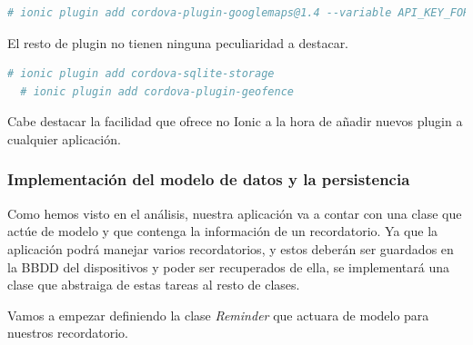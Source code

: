 \begin{lstlisting}[language=bash]
  # ionic plugin add cordova-plugin-googlemaps@1.4 --variable API_KEY_FOR_ANDROID=MY_API_KEY
\end{lstlisting}

El resto de plugin no tienen ninguna peculiaridad a destacar.

\begin{lstlisting}[language=bash]
  # ionic plugin add cordova-sqlite-storage
  # ionic plugin add cordova-plugin-geofence
\end{lstlisting}

Cabe destacar la facilidad que ofrece no Ionic a la hora de añadir nuevos plugin a cualquier aplicación.

\subsubsection{Implementación del modelo de datos y la persistencia}

Como hemos visto en el análisis, nuestra aplicación va a contar con una clase que actúe de modelo y que contenga la información de un recordatorio. Ya que la aplicación podrá manejar varios recordatorios, y estos deberán ser guardados en la \gls{BBDD} del dispositivos y poder ser recuperados de ella, se implementará una clase que abstraiga de estas tareas al resto de clases.


Vamos a empezar definiendo la clase \emph{Reminder} que actuara de modelo para nuestros recordatorio.

